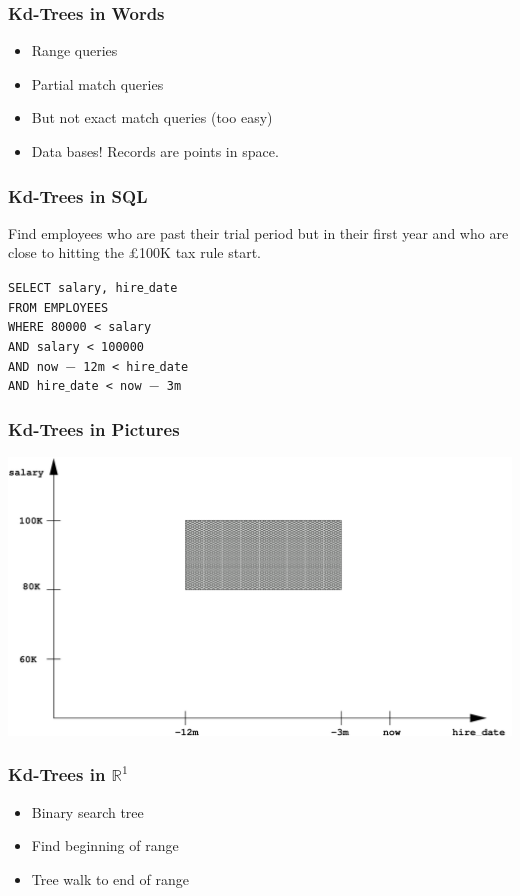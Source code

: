 \documentclass{beamer}
\begin{document}
\begin{frame}
  \frametitle{Kd-Trees in Words}
  \begin{itemize}
  \item Range queries
  \item Partial match queries
  \item But not exact match queries (too easy)
    \pause
  \item Data bases!  Records are points in space.
  \end{itemize}
\end{frame}

\begin{frame}
  \frametitle{Kd-Trees in SQL}

  Find employees who are past their trial period but in their first
  year and who are close to hitting the \pounds 100K tax rule start.

  \bigskip

  \texttt{SELECT salary, hire$\_$date\\
  FROM EMPLOYEES\\
  WHERE 80000 < salary \\
  \hspace{5mm}AND salary < 100000\\
  AND now $-$ 12m < hire$\_$date \\
  \hspace{5mm}AND hire$\_$date < now $-$ 3m}
\end{frame}

\begin{frame}
  \frametitle{Kd-Trees in Pictures}

  \includegraphics[width=\textwidth]{kd-SQL.pdf}
\end{frame}

\begin{frame}
  \frametitle{Kd-Trees in $\mathbb{R}^1$}
  
  \begin{itemize}
  \item Binary search tree
  \item Find beginning of range
  \item Tree walk to end of range
  \end{itemize}
\end{frame}
\end{document}
